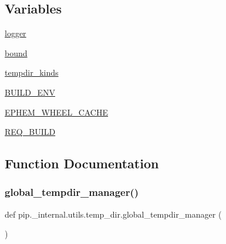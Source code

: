 \subsection*{Variables}
\begin{DoxyCompactItemize}
\item 
\hyperlink{namespacepip_1_1__internal_1_1utils_1_1temp__dir_ae5e9343700fa201e82f11953cab02fc3}{logger}
\item 
\hyperlink{namespacepip_1_1__internal_1_1utils_1_1temp__dir_a4bb8c418cb75def8f03dcbb67583f0c5}{bound}
\item 
\hyperlink{namespacepip_1_1__internal_1_1utils_1_1temp__dir_a6bb0e633defbe61bb60c1ce63a1c9afd}{tempdir\+\_\+kinds}
\item 
\hyperlink{namespacepip_1_1__internal_1_1utils_1_1temp__dir_a3e521991e8ebfee8f321d6085becd68e}{B\+U\+I\+L\+D\+\_\+\+E\+NV}
\item 
\hyperlink{namespacepip_1_1__internal_1_1utils_1_1temp__dir_adadf24f186512fd8c4635bdf4f209244}{E\+P\+H\+E\+M\+\_\+\+W\+H\+E\+E\+L\+\_\+\+C\+A\+C\+HE}
\item 
\hyperlink{namespacepip_1_1__internal_1_1utils_1_1temp__dir_a88803ac3978519a68ebeb43658dbf78a}{R\+E\+Q\+\_\+\+B\+U\+I\+LD}
\end{DoxyCompactItemize}


\subsection{Function Documentation}
\mbox{\label{namespacepip_1_1__internal_1_1utils_1_1temp__dir_a23b75e869bce0195b7ae8bade9d56a6c}} 
\subsubsection{\texorpdfstring{global\+\_\+tempdir\+\_\+manager()}{global\_tempdir\_manager()}}
{\footnotesize\ttfamily def pip.\+\_\+internal.\+utils.\+temp\+\_\+dir.\+global\+\_\+tempdir\+\_\+manager (\begin{DoxyParamCaption}{ }\end{DoxyParamCaption})}


